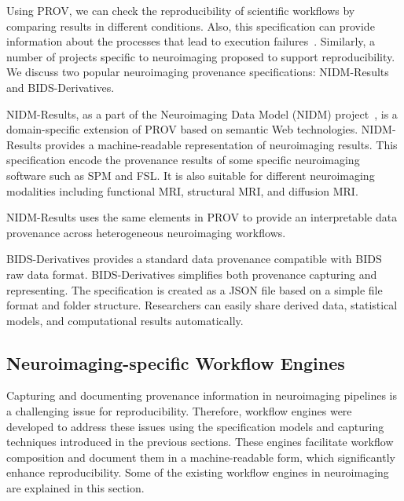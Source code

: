 Using PROV, we can check the reproducibility of scientific 
workflows by comparing results in different 
conditions. Also, this specification can provide information about the 
processes that lead to execution failures~\cite{missier2013w3c}. 
Similarly, a number of projects specific to neuroimaging 
proposed to support reproducibility.
We discuss two popular neuroimaging provenance specifications: NIDM-Results and BIDS-Derivatives. 

NIDM-Results, as a part of the Neuroimaging 
Data Model (NIDM) project~\cite{nidm-results}, is a domain-specific 
extension of PROV based on semantic Web technologies. NIDM-Results 
provides a machine-readable representation of neuroimaging results.
This specification encode the provenance results of some specific
neuroimaging software such as SPM and FSL. It is also suitable for different
neuroimaging modalities including functional MRI, structural MRI, and diffusion MRI.

NIDM-Results uses the same elements in PROV
to provide an interpretable data provenance 
across heterogeneous neuroimaging workflows.

BIDS-Derivatives provides a standard data provenance compatible with 
BIDS~\cite{gorgolewski2016brain} raw data format. BIDS-Derivatives 
simplifies both provenance capturing and representing.
The specification is created as a JSON file based on a simple file format 
and folder structure. Researchers can easily share derived 
data, statistical models, and computational results automatically. 


\subsection{Neuroimaging-specific Workflow Engines} 

Capturing and documenting provenance information in neuroimaging 
pipelines is a challenging issue for reproducibility. 
Therefore, workflow engines were developed to address these issues using 
the specification models and capturing techniques introduced in the 
previous sections. These engines facilitate workflow composition 
and document them in a machine-readable form, which 
significantly enhance reproducibility. Some of the existing workflow 
engines in neuroimaging are explained in this section. 

